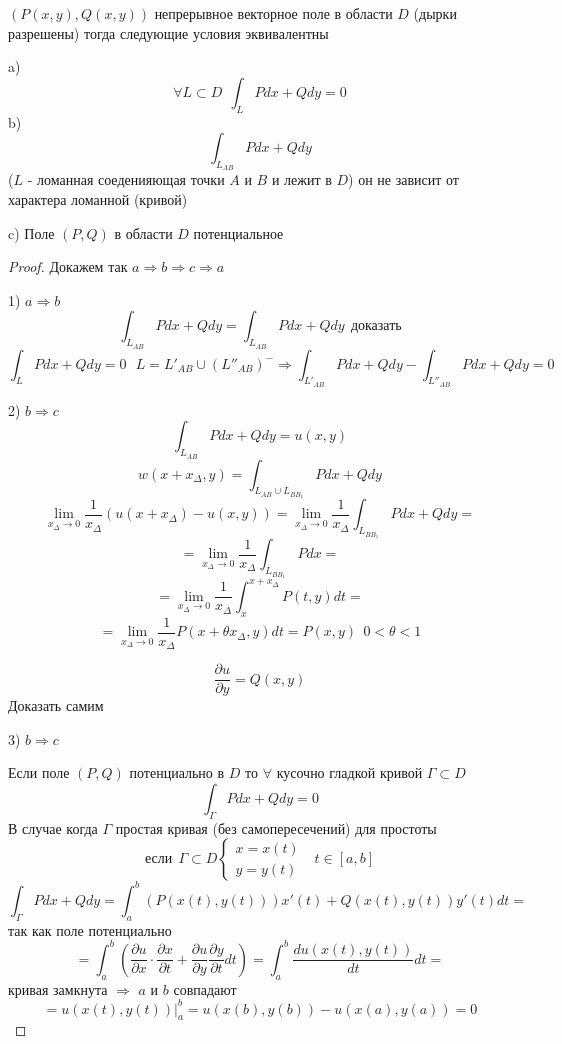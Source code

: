 \begin{theorem}
  $(P(x,y), Q(x,y))$ непрерывное векторное поле в области $D$ (дырки разрешены)
  тогда следующие условия эквивалентны

  a)
  $$
  \forall L \subset D ~~ \int_L Pdx + Qdy = 0
  $$
  b)
  $$
  \int_{L_{AB}} Pdx + Qdy
  $$
  ($L$ - ломанная соеденияющая точки $A$ и $B$ и лежит в $D$)
  он не зависит от характера ломанной (кривой)

  c) Поле $(P, Q)$ в области $D$ потенциальное
\end{theorem}

\begin{proof}
  Докажем так $a \Rightarrow b \Rightarrow c \Rightarrow a$

  1) $a \Rightarrow b$
  $$
  \int_{L_{AB}} Pdx + Qdy = \int_{L_{AB}} Pdx + Qdy ~~ \text{доказать}
  $$
  $$
  \int_L Pdx + Qdy = 0 ~~~ L = L'_{AB} \cup (L''_{AB})^- \Rightarrow
  \int_{L'_{AB}} Pdx + Qdy - \int_{L''_{AB}} Pdx + Qdy = 0
  $$

  2) $b \Rightarrow c$
  $$
  \int_{L_{AB}} Pdx + Qdy = u(x,y)
  $$
  $$
  w(x + x_{\Delta}, y) = \int_{L_{AB} \cup L_{BB_1}} Pdx + Qdy
  $$
  $$
  \lim_{x_{\Delta} \to 0} \frac{1}{x_{\Delta}} (u(x + x_{\Delta}) - u(x,y))
  = \lim_{x_{\Delta} \to 0} \frac{1}{x_{\Delta}} \int_{L_{BB_1}} Pdx + Qdy =
  $$
  $$
  = \lim_{x_{\Delta} \to 0} \frac{1}{x_{\Delta}} \int_{L_{BB_1}} Pdx =
  $$
  $$
  = \lim_{x_{\Delta} \to 0} \frac{1}{x_{\Delta}} \int_x^{x+x_{\Delta}}
  P(t, y)dt =
  $$
  $$
  = \lim_{x_{\Delta} \to 0} \frac{1}{x_{\Delta}} P(x + \theta x_{\Delta}, y)dt
  = P(x,y) ~~ 0 < \theta < 1
  $$

  $$
  \frac{\partial u}{\partial y} = Q(x,y)
  $$
  Доказать самим

  3) $b \Rightarrow c$

  Если поле $(P, Q)$ потенциально в $D$ то $\forall$ кусочно гладкой кривой
  $\Gamma \subset D$
  $$
  \int_{\Gamma} P dx + Q dy = 0
  $$
  В случае когда $\Gamma$ простая кривая (без самопересечений) для простоты
  $$
  \text{если} ~~ \Gamma \subset D
  \left\{
  \begin{array}{l}
    x = x(t) \\
    y = y(t)
  \end{array}
  \right.
  ~~~ t \in [a,b]
  $$
  $$
  \int_{\Gamma} Pdx + Qdy = \int_a^b (P(x(t), y(t)))x'(t) +
  Q(x(t), y(t))y'(t)dt =
  $$
  так как поле потенциально
  $$
  = \int_a^b \left( \frac{\partial u}{\partial x} \cdot
  \frac{\partial x}{\partial t} + \frac{\partial u}{\partial y}
  \frac{\partial y}{\partial t} dt \right) = \int_a^b
  \frac{du(x(t), y(t))}{dt} dt =
  $$
  кривая замкнута $\Rightarrow$ $a$ и $b$ совпадают
  $$
  = u(x(t), y(t))|_a^b = u(x(b), y(b)) - u(x(a), y(a)) = 0
  $$
\end{proof}

